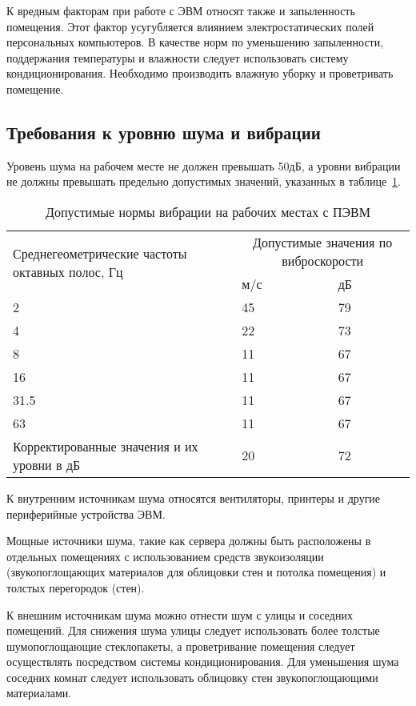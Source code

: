 К вредным факторам при работе с ЭВМ относят также и запыленность помещения.
Этот фактор усугубляется влиянием электростатических полей персональных
компьютеров. В качестве норм по уменьшению запыленности, поддержания
температуры и влажности следует использовать систему кондиционирования.
Необходимо производить влажную уборку и проветривать помещение.

\subsection{Требования к уровню шума и вибрации}
Уровень шума на рабочем месте не должен превышать 50дБ, а уровни вибрации не
должны превышать предельно допустимых значений, указанных в
таблице~\ref{tab:vibration}.

\begin{table}
  \centering
  \caption{Допустимые нормы вибрации на рабочих местах с ПЭВМ}
  \label{tab:vibration}
  \begin{tabular}{|p{}|p{}|p{}|}
    \hline
    \multirow{2}{\hsize}{Среднегеометрические частоты октавных полос, Гц} &
    \multicolumn{2}{|c|}{Допустимые значения по виброскорости} \\
    \cline{2-3}
    & м/с & дБ \\
    \hline
    2 & 45 & 79 \\
    \hline
    4 & 22 & 73 \\
    \hline
    8 & 11 & 67\\
    \hline
    16 & 11 & 67 \\
    \hline
    31.5 & 11 & 67 \\
    \hline
    63 & 11 & 67 \\
    \hline
    Корректированные значения и их уровни в дБ & 20 & 72 \\
    \hline
  \end{tabular}
\end{table}

К внутренним источникам шума относятся вентиляторы, принтеры и другие
периферийные устройства ЭВМ.

Мощные источники шума, такие как сервера должны быть расположены в отдельных
помещениях с использованием средств звукоизоляции (звукопоглощающих материалов
для облицовки стен и потолка помещения) и толстых перегородок (стен).

К внешним источникам шума можно отнести шум с улицы и соседних помещений. Для
снижения шума улицы следует использовать более толстые шумопоглощающие
стеклопакеты, а проветривание помещения следует осуществлять посредством
системы кондиционирования. Для уменьшения шума соседних комнат следует
использовать облицовку стен звукопоглощающими материалами.

